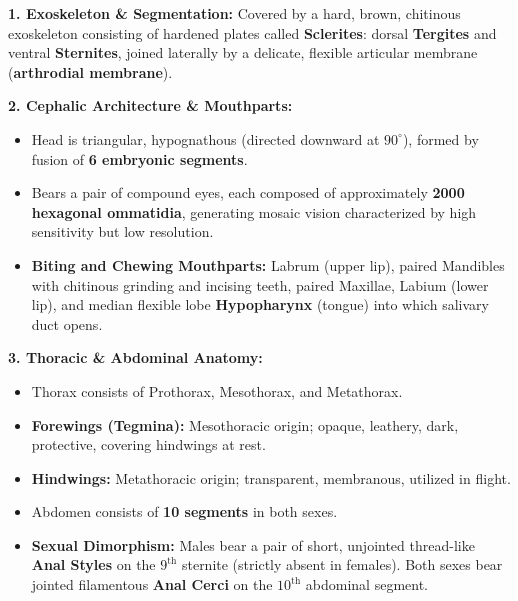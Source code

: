 \documentclass[10pt,twoside,openright]{book}
\begin{document}
\begin{conceptbox}
\textbf{1. Exoskeleton \& Segmentation:}
Covered by a hard, brown, chitinous exoskeleton consisting of hardened plates called \textbf{Sclerites}: dorsal \textbf{Tergites} and ventral \textbf{Sternites}, joined laterally by a delicate, flexible articular membrane (\textbf{arthrodial membrane}).

\textbf{2. Cephalic Architecture \& Mouthparts:}
\begin{itemize}
  \item Head is triangular, hypognathous (directed downward at $90^\circ$), formed by fusion of \textbf{6 embryonic segments}.
  \item Bears a pair of compound eyes, each composed of approximately \textbf{2000 hexagonal ommatidia}, generating mosaic vision characterized by high sensitivity but low resolution.
  \item \textbf{Biting and Chewing Mouthparts:} Labrum (upper lip), paired Mandibles with chitinous grinding and incising teeth, paired Maxillae, Labium (lower lip), and median flexible lobe \textbf{Hypopharynx} (tongue) into which salivary duct opens.
\end{itemize}

\textbf{3. Thoracic \& Abdominal Anatomy:}
\begin{itemize}
  \item Thorax consists of Prothorax, Mesothorax, and Metathorax.
  \item \textbf{Forewings (Tegmina):} Mesothoracic origin; opaque, leathery, dark, protective, covering hindwings at rest.
  \item \textbf{Hindwings:} Metathoracic origin; transparent, membranous, utilized in flight.
  \item Abdomen consists of \textbf{10 segments} in both sexes.
  \item \textbf{Sexual Dimorphism:} Males bear a pair of short, unjointed thread-like \textbf{Anal Styles} on the $9^{\mathrm{th}}$ sternite (strictly absent in females). Both sexes bear jointed filamentous \textbf{Anal Cerci} on the $10^{\mathrm{th}}$ abdominal segment.
\end{itemize}


\end{conceptbox}
\end{document}
